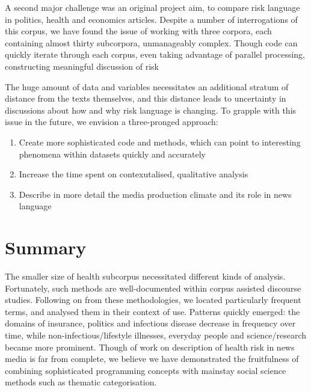 A second major challenge was an original project aim, to compare risk language in politics, health and economics articles. Despite a number of interrogations of this corpus, we have found the issue of working with three corpora, each containing almost thirty subcorpora, unmanageably complex. Though code can quickly iterate through each corpus, even taking advantage of parallel processing, constructing meaningful discussion of risk 

The huge amount of data and variables necessitates an additional stratum of distance from the texts themselves, and this distance leads to uncertainty in discussions about how and why risk language is changing. To grapple with this issue in the future, we envision a three-pronged approach:

\begin{enumerate}
  \item Create more sophisticated code and methods, which can point to interesting phenomena within datasets quickly and accurately
  \item Increase the time spent on contexutalised, qualitative analysis
  \item Describe in more detail the media production climate and its role in news language
\end{enumerate}

\section{Summary}

  The smaller size of health subcorpus necessitated different kinds of analysis. Fortunately, such methods are well-documented within corpus assisted discourse studies. Following on from these methodologies, we located particularly frequent terms, and analysed them in their context of use. Patterns quickly emerged: the domains of insurance, politics and infectious disease decrease in frequency over time, while non-infectious\slash lifestyle illnesses, everyday people and science\slash research became more prominent. Though of work on description of health risk in news media is far from complete, we believe we have demonstrated the fruitfulness of combining sophisticated programming concepts with mainstay social science methods such as thematic categorisation.
